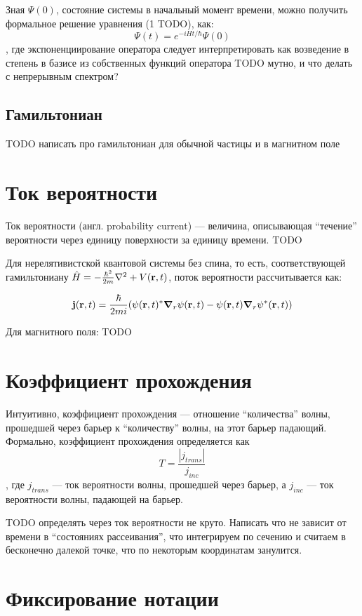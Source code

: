 Зная $\Psi(0)$, состояние системы в начальный момент времени, можно получить формальное решение уравнения (1 TODO), как:
\[
\Psi(t) = e^{-i H t / \hbar} \Psi(0)
\]
, где экспоненциирование оператора следует интерпретировать как возведение в степень в базисе из собственных функций оператора TODO мутно, и что делать с непрерывным спектром?

\subsection{Гамильтониан}
TODO написать про гамильтониан для обычной частицы и в магнитном поле

\section{Ток вероятности}
Ток вероятности (англ. probability current) — величина, описывающая ``течение'' вероятности через единицу поверхности за единицу времени. TODO 


Для нерелятивистской квантовой системы без спина, то есть, соответствующей гамильтониану $\hat{H} = - \frac{\hbar^2}{2m} \laplacian + V(\vb{r}, t)$, поток вероятности рассчитывается как:

\[
\vb{j}(\vb{r}, t) = \frac{\hbar}{2 m i} (\psi(\vb{r}, t)^* \grad_r{\psi(\vb{r}, t)} - \psi(\vb{r}, t) \grad_r{\psi^*(\vb{r}, t))}
\]

Для магнитного поля: TODO

\section{Коэффициент прохождения}
Интуитивно, коэффициент прохождения — отношение ``количества'' волны, прошедшей через барьер к ``количеству'' волны, на этот барьер падающий. Формально, коэффициент прохождения определяется как
\[
T = \frac{|j_{trans}|}{j_{inc}}
\]
, где $j_{trans}$ — ток вероятности волны, прошедшей через барьер, а $j_{inc}$ — ток вероятности волны, падающей на барьер.

TODO определять через ток вероятности не круто. Написать что не зависит от времени в ``состояниях рассеивания'', что интегрируем по сечению и считаем в бесконечно далекой точке, что по некоторым координатам занулится.

\section{Фиксирование нотации}


